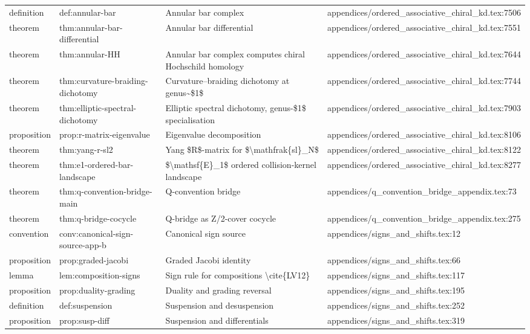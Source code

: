 \documentclass[11pt]{article}
\begin{document}
\begin{longtable}{L{0.10\textwidth}L{0.26\textwidth}L{0.42\textwidth}L{0.22\textwidth}}
definition & def:annular-bar & Annular bar complex & appendices/ordered\_associative\_chiral\_kd.tex:7506\\
theorem & thm:annular-bar-differential & Annular bar differential & appendices/ordered\_associative\_chiral\_kd.tex:7551\\
theorem & thm:annular-HH & Annular bar complex computes chiral Hochschild homology & appendices/ordered\_associative\_chiral\_kd.tex:7644\\
theorem & thm:curvature-braiding-dichotomy & Curvature--braiding dichotomy at genus\textasciitilde{}\$1\$ & appendices/ordered\_associative\_chiral\_kd.tex:7744\\
theorem & thm:elliptic-spectral-dichotomy & Elliptic spectral dichotomy, genus-\$1\$ specialisation & appendices/ordered\_associative\_chiral\_kd.tex:7903\\
proposition & prop:r-matrix-eigenvalue & Eigenvalue decomposition & appendices/ordered\_associative\_chiral\_kd.tex:8106\\
theorem & thm:yang-r-sl2 & Yang \$R\$-matrix for \$\textbackslash{}mathfrak\{sl\}\_N\$ & appendices/ordered\_associative\_chiral\_kd.tex:8122\\
theorem & thm:e1-ordered-bar-landscape & \$\textbackslash{}mathsf\{E\}\_1\$ ordered collision-kernel landscape & appendices/ordered\_associative\_chiral\_kd.tex:8277\\
theorem & thm:q-convention-bridge-main & Q-convention bridge & appendices/q\_convention\_bridge\_appendix.tex:73\\
theorem & thm:q-bridge-cocycle & Q-bridge as Z/2-cover cocycle & appendices/q\_convention\_bridge\_appendix.tex:275\\
convention & conv:canonical-sign-source-app-b & Canonical sign source & appendices/signs\_and\_shifts.tex:12\\
proposition & prop:graded-jacobi & Graded Jacobi identity & appendices/signs\_and\_shifts.tex:66\\
lemma & lem:composition-signs & Sign rule for compositions \textbackslash{}cite\{LV12\} & appendices/signs\_and\_shifts.tex:117\\
proposition & prop:duality-grading & Duality and grading reversal & appendices/signs\_and\_shifts.tex:195\\
definition & def:suspension & Suspension and desuspension & appendices/signs\_and\_shifts.tex:252\\
proposition & prop:susp-diff & Suspension and differentials & appendices/signs\_and\_shifts.tex:319\\

\end{longtable}
\end{document}
